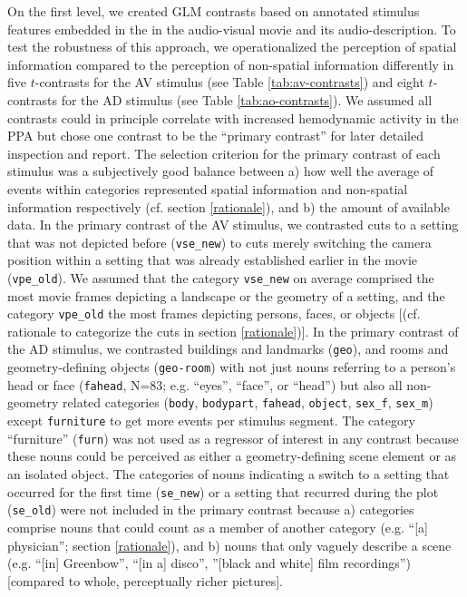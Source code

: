 \documentclass[english]{article}
\begin{document}
On the first level, we created GLM contrasts based on annotated stimulus
features embedded in the in the audio-visual movie and its audio-description.
To test the robustness of this approach, we operationalized the perception of
spatial information compared to the perception of non-spatial information
differently in five $t$-contrasts for the AV stimulus (see Table
\ref{tab:av-contrasts}) and eight $t$-contrasts for the AD stimulus (see Table
\ref{tab:ao-contrasts}).
We assumed all contrasts could in principle correlate with increased hemodynamic
activity in the PPA but chose one contrast to be the ``primary contrast'' for
later detailed inspection and report.
The selection criterion for the primary contrast of each stimulus was a
subjectively good balance between a) how well the average of events within
categories represented spatial information and non-spatial information
respectively (cf. section \ref{rationale}), and b) the amount of available data.
In the primary contrast of the AV stimulus, we contrasted cuts to a setting that
was not depicted before (\texttt{vse\_new}) to cuts merely switching the camera
position within a setting that was already established earlier in the movie
(\texttt{vpe\_old}).
We assumed that the category \texttt{vse\_new} on average comprised the most
movie frames depicting a landscape or the geometry of a setting, and the
category \texttt{vpe\_old} the most frames depicting persons, faces, or objects
[(cf.  rationale to categorize the cuts in section \ref{rationale})].
In the primary contrast of the AD stimulus, we contrasted buildings and
landmarks (\texttt{geo}), and rooms and geometry-defining objects
(\texttt{geo-room}) with not just nouns referring to a person's head or face
(\texttt{fahead}, N=83; e.g.  ``eyes'', ``face'', or ``head'') but also all
non-geometry related categories (\texttt{body}, \texttt{bodypart},
\texttt{fahead}, \texttt{object}, \texttt{sex\_f}, \texttt{sex\_m}) except
\texttt{furniture} to get more events per stimulus segment.
The category ``furniture'' (\texttt{furn}) was not used as a regressor of
interest in any contrast because these nouns could be perceived as either a
geometry-defining scene element or as an isolated object.
The categories of nouns indicating a switch to a setting that occurred for the
first time (\texttt{se\_new}) or a setting that recurred during the plot
(\texttt{se\_old}) were not included in the primary contrast because
a) categories comprise nouns that could count as a member of another category
(e.g. ``[a] physician''; section \ref{rationale}), and
b) nouns that only vaguely describe a scene (e.g. ``[in] Greenbow'', ``[in a]
disco'', ''[black and white] film recordings'') [compared to whole, perceptually
richer pictures].
\end{document}
